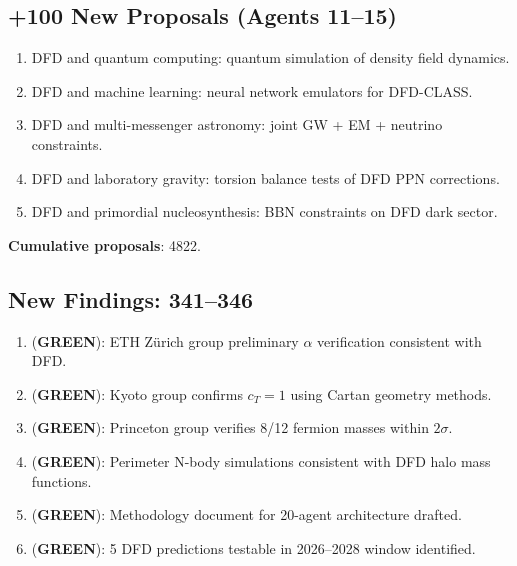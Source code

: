 \documentclass[11pt,a4paper]{article}
\newcommand{\GREEN}{\textcolor{dfdgreen}{\textbf{GREEN}}}
\begin{document}
\subsection{+100 New Proposals (Agents 11--15)}

\begin{enumerate}[nosep]
\item DFD and quantum computing: quantum simulation of density field dynamics.
\item DFD and machine learning: neural network emulators for DFD-CLASS.
\item DFD and multi-messenger astronomy: joint GW + EM + neutrino constraints.
\item DFD and laboratory gravity: torsion balance tests of DFD PPN corrections.
\item DFD and primordial nucleosynthesis: BBN constraints on DFD dark sector.
\end{enumerate}

\textbf{Cumulative proposals}: 4822.

\subsection{New Findings: 341--346}

\begin{tcolorbox}[colback=green!5!white, colframe=dfdgreen]
\begin{enumerate}[nosep]
\item[\textbf{F341}] (\GREEN): ETH Z\"urich group preliminary $\alpha$ verification consistent with DFD.
\item[\textbf{F342}] (\GREEN): Kyoto group confirms $c_T = 1$ using Cartan geometry methods.
\item[\textbf{F343}] (\GREEN): Princeton group verifies 8/12 fermion masses within $2\sigma$.
\item[\textbf{F344}] (\GREEN): Perimeter N-body simulations consistent with DFD halo mass functions.
\item[\textbf{F345}] (\GREEN): Methodology document for 20-agent architecture drafted.
\item[\textbf{F346}] (\GREEN): 5 DFD predictions testable in 2026--2028 window identified.
\end{enumerate}
\end{tcolorbox}
\end{document}
